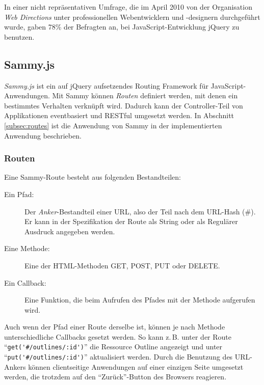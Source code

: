 In einer nicht repräsentativen Umfrage, die im April 2010 von der Organisation \textit{Web Directions} unter professionellen Webentwicklern und -designern durchgeführt wurde, gaben 78\% der Befragten an, bei JavaScript-Entwicklung jQuery zu benutzen. \cite{jquery:verbreitung}




\subsection{Sammy.js}
\label{subsec:sammy}

\textit{Sammy.js} \cite{sammy:homepage} ist ein auf jQuery aufsetzendes Routing Framework für JavaScript-Anwendungen. Mit Sammy können \textit{Routen} definiert werden, mit denen ein bestimmtes Verhalten verknüpft wird. Dadurch kann der Controller-Teil von Applikationen eventbasiert und RESTful umgesetzt werden. In Abschnitt \ref{subsec:routes} ist die Anwendung von Sammy in der implementierten Anwendung beschrieben. 


\subsubsection{Routen}

Eine Sammy-Route besteht aus folgenden Bestandteilen:

\begin{description}
  \item[Ein Pfad:] Der \textit{Anker}-Bestandteil einer URL, also der Teil nach dem URL-Hash ({\selectfont\#}). Er kann in der Spezifikation der Route als String oder als Regulärer Ausdruck angegeben werden. 
  \item[Eine Methode:] Eine der HTML-Methoden {\selectfont GET}, {\selectfont POST}, {\selectfont PUT} oder {\selectfont DELETE}.
  \item[Ein Callback:] Eine Funktion, die beim Aufrufen des Pfades mit der Methode aufgerufen wird.
\end{description}

Auch wenn der Pfad einer Route derselbe ist, können je nach Methode unterschiedliche Callbacks gesetzt werden. So kann z.\,B. unter der Route \enquote{\lstinline!get('#/outlines/:id')!} die Ressource Outline angezeigt und unter \enquote{\lstinline!put('#/outlines/:id')!} aktualisiert werden. Durch die Benutzung des URL-Ankers können clientseitige Anwendungen auf einer einzigen Seite umgesetzt werden, die trotzdem auf den \enquote{Zurück}-Button des Browsers reagieren.

